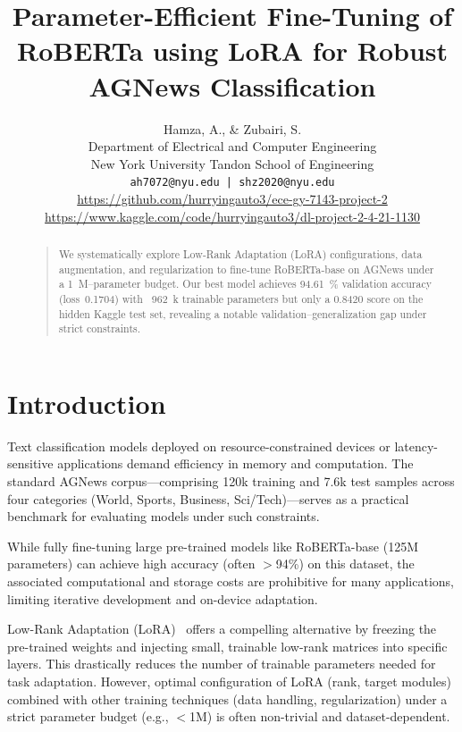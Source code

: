 \documentclass[letterpaper]{article}
\begin{document}
\title{Parameter-Efficient Fine-Tuning of RoBERTa using LoRA for Robust AGNews Classification}

\author{Hamza, A., \& Zubairi, S. \\
Department of Electrical and Computer Engineering\\
New York University Tandon School of Engineering\\
\texttt{ah7072@nyu.edu | shz2020@nyu.edu}\\
\url{https://github.com/hurryingauto3/ece-gy-7143-project-2}\\
\url{https://www.kaggle.com/code/hurryingauto3/dl-project-2-4-21-1130}
}
\maketitle

\begin{abstract}
    \begin{quote}
    We systematically explore Low‑Rank Adaptation (LoRA) configurations, data augmentation, and regularization to fine‑tune RoBERTa‑base on AGNews under a 1 M–parameter budget. Our best model achieves 94.61 \% validation accuracy (loss 0.1704) with ~962 k trainable parameters but only a 0.8420 score on the hidden Kaggle test set, revealing a notable validation–generalization gap under strict constraints.
    \end{quote}
    \end{abstract}

\section{Introduction}
Text classification models deployed on resource-constrained devices or latency-sensitive applications demand efficiency in memory and computation. The standard AGNews corpus—comprising 120k training and 7.6k test samples across four categories (World, Sports, Business, Sci/Tech)—serves as a practical benchmark for evaluating models under such constraints.

While fully fine-tuning large pre-trained models like RoBERTa-base (125M parameters) can achieve high accuracy (often $>$94\%) on this dataset, the associated computational and storage costs are prohibitive for many applications, limiting iterative development and on-device adaptation.

Low-Rank Adaptation (LoRA)~\cite{hu2022lora} offers a compelling alternative by freezing the pre-trained weights and injecting small, trainable low-rank matrices into specific layers. This drastically reduces the number of trainable parameters needed for task adaptation. However, optimal configuration of LoRA (rank, target modules) combined with other training techniques (data handling, regularization) under a strict parameter budget (e.g., $<$1M) is often non-trivial and dataset-dependent.
\end{document}
